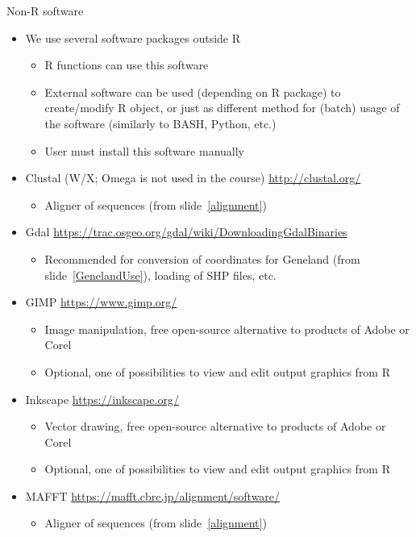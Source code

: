 \documentclass[compress, ucs, xelatex, 11pt, xcolor=svgnames,
	hyperref={
		bookmarks=true,
		unicode=true,
		colorlinks=true,
		pdftitle={Molecular data in R},
		plainpages=false,
		pdfauthor={Vojtech Zeisek},
		pdfsubject={Course about phylogeny and evolution in R},
		pdfcreator={XeLaTeX},
		pdfkeywords={R, evolution, phylogeny, molecular data},
		linkcolor=Tomato,
		anchorcolor=SaddleBrown,
		citecolor=Goldenrod,
		filecolor=DarkMagenta,
		menucolor=Sienna,
		urlcolor=DarkTurquoise,
		pdftex},
	url={hyphens, lowtilde} %
	]{beamer}
\begin{document}
\begin{frame}[allowframebreaks]{Non-R software}
	\begin{itemize}
		\item We use several software packages outside R
		\begin{itemize}
			\item R functions can use this software
			\item External software can be used (depending on R package) to create/modify R object, or just as different method for (batch) usage of the software (similarly to BASH, Python, etc.)
			\item User must install this software manually
		\end{itemize}
		\item Clustal (W/X; Omega is not used in the course) \url{http://clustal.org/}
		\begin{itemize}
			\item Aligner of sequences (from slide~\ref{alignment})
		\end{itemize}
		\item Gdal \url{https://trac.osgeo.org/gdal/wiki/DownloadingGdalBinaries}
		\begin{itemize}
			\item Recommended for conversion of coordinates for Geneland (from slide~\ref{GenelandUse}), loading of SHP files, etc.
		\end{itemize}
		\item GIMP \url{https://www.gimp.org/}
		\begin{itemize}
			\item Image manipulation, free open-source alternative to products of Adobe or Corel
			\item Optional, one of possibilities to view and edit output graphics from R
		\end{itemize}
		\item Inkscape \url{https://inkscape.org/}
		\begin{itemize}
			\item Vector drawing, free open-source alternative to products of Adobe or Corel
			\item Optional, one of possibilities to view and edit output graphics from R
		\end{itemize}
		\item MAFFT \url{https://mafft.cbrc.jp/alignment/software/}
		\begin{itemize}
			\item Aligner of sequences (from slide~\ref{alignment})

\end{itemize}
\end{itemize}
\end{frame}
\end{document}
